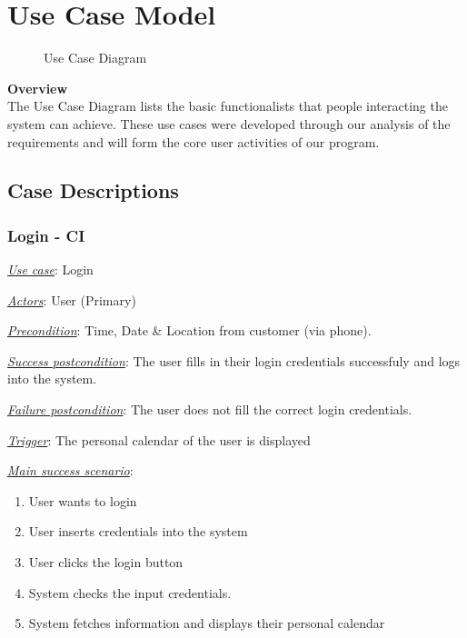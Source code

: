 \documentclass[a4paper]{article}
\begin{document}
\clearpage
\section{Use Case Model}
\begin{figure}[!ht] %
    \centering{} %
    \caption{Use Case Diagram}
    \label{fig:usecase}
\end{figure}
\textbf{Overview} \\
 The Use Case Diagram lists the basic functionalists that people interacting the system can achieve. These use cases were developed through our analysis of the requirements and will form the core user activities of our program.

\subsection{Case Descriptions} %
\subsubsection{Login - CI}
\underline{\textit{Use case}}: Login

\underline{\textit{Actors}}: User (Primary)

\underline{\textit{Precondition}}: Time, Date \& Location from customer (via phone).

\underline{\textit{Success postcondition}}: The user fills in their login credentials successfuly and logs into the system.

\underline{\textit{Failure postcondition}}: The user does not fill the correct login credentials.

\underline{\textit{Trigger}}: The personal calendar of the user is displayed

\underline{\textit{Main success scenario}}: 
\begin{enumerate}[leftmargin = 3em]
    \item User wants to login
    \item User inserts credentials into the system
    \item User clicks the login button
    \item System checks the input credentials.
    \item System fetches information and displays their personal calendar
\end{enumerate} 
\end{document}
